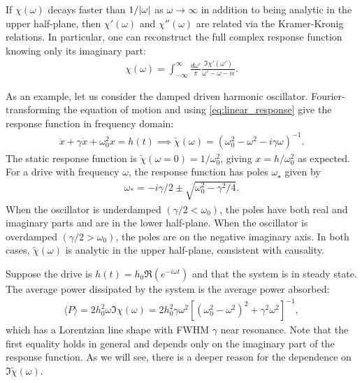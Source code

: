 \documentclass[reprint,
nofootinbib,
amsmath,amssymb,
aps]{revtex4-1}
\newcommand{\f}[2]{\frac{#1}{#2}}
\begin{document}
If $\chi(\omega)$ decays faster than $1/\abs{\omega}$ as $\omega \to \infty$ in addition to being analytic in the upper half-plane, then $\chi'(\omega)$ and $\chi''(\omega)$ are related via the Kramer-Kronig relations. In particular, one can reconstruct the full complex response function knowing only its imaginary part:
\begin{align*}
\chi(\omega) = \int_{-\infty}^\infty \f{d\omega'}{\pi} \f{\Im \chi'(\omega')}{\omega' - \omega - i\epsilon}.
\end{align*}

As an example, let us consider the damped driven harmonic oscillator. Fourier-transforming the equation of motion and using  \eqref{eq:linear_response} give the response function in frequency domain:
\begin{align*}
\ddot{x} + \gamma \dot{x} + \omega_0^2 x = h(t) \implies 
\tilde{\chi}(\omega) = ( \omega_0^2 - \omega^2 - i \gamma \omega)^{-1}.
\end{align*}
The static response function is $\tilde{\chi}(\omega = 0) = 1/\omega_0^2$, giving $x = h/\omega_0^2$ as expected. For a drive with frequency $\omega$, the response function has poles $\omega_\star$ given by 
\begin{align*}
\omega_* = -i\gamma/2 \pm \sqrt{\omega_0^2  - \gamma^2/4}.
\end{align*}
When the oscillator is underdamped $(\gamma/2 < \omega_0)$, the poles have both real and imaginary parts and are in the lower half-plane. When the oscillator is overdamped $(\gamma/2 > \omega_0)$, the poles are on the negative imaginary axis. In both cases, $\tilde{\chi}(\omega)$ is analytic in the upper half-plane, consistent with causality. 

Suppose the drive is $h(t) = h_0 \Re(e^{-i\omega t})$ and that the system is in steady state. The average power dissipated by the system is the average power absorbed: 
\begin{align*}
\langle P \rangle = 2h_0^2 \omega \Im\chi(\omega) = 2h_0^2  \gamma \omega^2 [(\omega_0^2 - \omega^2)^2 + \gamma^2 \omega^2]^{-1},
\end{align*}
which has a Lorentzian line shape with FWHM $\gamma$ near resonance. Note that the first equality holds in general and depends only on the imaginary part of the response function. As we will see, there is a deeper reason for the dependence on $\Im \tilde{\chi}(\omega)$.

%
\end{document}
